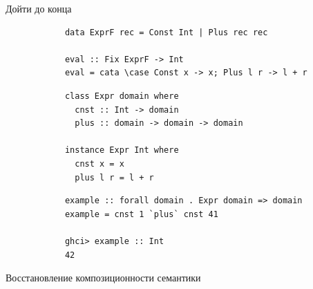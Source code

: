     \begin{frame}[fragile]{Дойти до конца}
        \pause
        \begin{verbatim}
            data ExprF rec = Const Int | Plus rec rec

            eval :: Fix ExprF -> Int
            eval = cata \case Const x -> x; Plus l r -> l + r
        \end{verbatim}
        \pause\vspace{1em}
        \begin{verbatim}
            class Expr domain where
              cnst :: Int -> domain
              plus :: domain -> domain -> domain

            instance Expr Int where
              cnst x = x
              plus l r = l + r
        \end{verbatim}
        \pause\vspace{1em}
        \begin{verbatim}
            example :: forall domain . Expr domain => domain
            example = cnst 1 `plus` cnst 41

            ghci> example :: Int
            42
        \end{verbatim}
    \end{frame}

    \begin{frame}[fragile]{Восстановление композиционности семантики}
    \end{frame}

